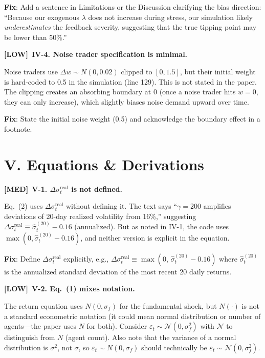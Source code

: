 \documentclass[12pt,a4paper]{article}
\newcommand{\MED}{\textbf{\textcolor{warncolor}{[MED]}}}
\newcommand{\LOW}{\textbf{\textcolor{okgreen}{[LOW]}}}
\begin{document}
\textbf{Fix}: Add a sentence in Limitations or the Discussion clarifying the bias direction: ``Because our exogenous $\lambda$ does not increase during stress, our simulation likely \emph{underestimates} the feedback severity, suggesting that the true tipping point may be lower than 50\%.''

\medskip

\LOW\ \textbf{IV-4. Noise trader specification is minimal.}

Noise traders use $\Delta w \sim N(0, 0.02)$ clipped to $[0, 1.5]$, but their initial weight is hard-coded to 0.5 in the simulation (line 129). This is not stated in the paper. The clipping creates an absorbing boundary at 0 (once a noise trader hits $w=0$, they can only increase), which slightly biases noise demand upward over time.

\textbf{Fix}: State the initial noise weight (0.5) and acknowledge the boundary effect in a footnote.


\section*{V. Equations \& Derivations}

\MED\ \textbf{V-1. $\Delta\sigma^{\text{real}}_t$ is not defined.}

Eq.~(2) uses $\Delta\sigma^{\text{real}}_t$ without defining it. The text says ``$\gamma = 200$ amplifies deviations of 20-day realized volatility from 16\%,'' suggesting $\Delta\sigma^{\text{real}}_t \equiv \hat{\sigma}^{(20)}_t - 0.16$ (annualized). But as noted in IV-1, the code uses $\max(0, \hat{\sigma}^{(20)}_t - 0.16)$, and neither version is explicit in the equation.

\textbf{Fix}: Define $\Delta\sigma^{\text{real}}_t$ explicitly, e.g., $\Delta\sigma^{\text{real}}_t \equiv \max\!\left(0,\, \hat{\sigma}^{(20)}_t - 0.16\right)$ where $\hat{\sigma}^{(20)}_t$ is the annualized standard deviation of the most recent 20 daily returns.

\medskip

\LOW\ \textbf{V-2. Eq.~(1) mixes notation.}

The return equation uses $N(0, \sigma_f)$ for the fundamental shock, but $N(\cdot)$ is not a standard econometric notation (it could mean normal distribution or number of agents---the paper uses $N$ for both). Consider $\varepsilon_t \sim \mathcal{N}(0, \sigma_f^2)$ with $\mathcal{N}$ to distinguish from $N$ (agent count). Also note that the variance of a normal distribution is $\sigma^2$, not $\sigma$, so $\varepsilon_t \sim N(0, \sigma_f)$ should technically be $\varepsilon_t \sim \mathcal{N}(0, \sigma_f^2)$.
\end{document}

